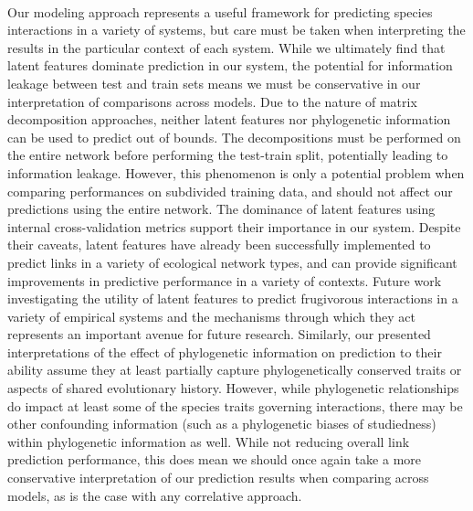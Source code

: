 \paragraph*{} Our modeling approach represents a useful framework for predicting species interactions in a variety of systems, but care must be taken when interpreting the results in the particular context of each system. While we ultimately find that latent features dominate prediction in our system, the potential for information leakage between test and train sets means we must be conservative in our interpretation of comparisons across models. Due to the nature of matrix decomposition approaches, neither latent features nor phylogenetic information can be used to predict out of bounds. The decompositions must be performed on the entire network before performing the test-train split, potentially leading to information leakage. However, this phenomenon is only a potential problem when comparing performances on subdivided training data, and should not affect our predictions using the entire network. The dominance of latent features using internal cross-validation metrics support their importance in our system. Despite their caveats, latent features have already been successfully implemented to predict links in a variety of ecological network types, and can provide significant improvements in predictive performance in a variety of contexts.\cite{banville2023constrains, poisot2021imputing, poisot2023network, nunes2024estimated} Future work investigating the utility of latent features to predict frugivorous interactions in a variety of empirical systems and the mechanisms through which they act represents an important avenue for future research.  Similarly, our presented interpretations of the effect of phylogenetic information on prediction to their ability assume they at least partially capture phylogenetically conserved traits  or aspects of shared evolutionary history. However, while phylogenetic relationships do impact at least some of the species traits governing interactions, there may be other confounding information (such as a phylogenetic  biases of studiedness) within phylogenetic information as well. While not reducing overall link prediction performance, this does mean we should once again take a more conservative interpretation of our prediction results when comparing across models, as is the case with any correlative approach. 

